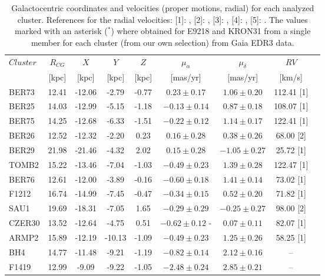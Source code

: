 \documentclass[referee]{aa}
\begin{document}
\begin{appendix}
  \begin{table}
   \caption{Galactocentric coordinates and velocities (proper motions, radial)
   for each analyzed cluster. References for the radial velocities: [1]: 
   \cite{Tarricq_2021}, [2]: \cite{Dias_2002}, [3]: \cite{Soubiran_2018}, [4]: 
   \cite{Dias_2007}, [5]: \cite{Frinchaboy_2006}. The values marked with an
   asterisk ($^*$) where obtained for E9218 and KRON31 from a single member for
   each cluster (from our own selection) from Gaia EDR3 data.}
   \label{tab:velocities}
   \centering
   \renewcommand{\arraystretch}{1.3}
   \begin{tabular}{lcccccccc}
    \hline \hline
    $Cluster$ & $R_{CG}$ & $X$ & $Y$ & $Z$ & $\mu_{\alpha}$ & $\mu_{\delta}$ & $RV$\\
     & [kpc] & [kpc] & [kpc] & [kpc] & [mas/yr] & [mas/yr] & [km/s]\\
    \hline
    BER73 & 12.41 & -12.06  & -2.79 & -0.77 & $0.23 \pm 0.17$ & $1.06 \pm 0.20$ & 112.41  [1]\\
    BER25 & 14.03 & -12.99  & -5.15 & -1.18 & $-0.13  \pm 0.14$ & $0.87 \pm 0.18$ & 108.07  [1]\\
    BER75 & 14.25 & -12.68  & -6.33 & -1.51 & $-0.22  \pm 0.12$ & $1.14 \pm 0.17$ & 122.41  [1]\\
    BER26 & 12.52 & -12.32  & -2.20 & 0.23  & $0.16 \pm 0.28$ & $0.38 \pm 0.26$ & 68.00 [2]\\
    BER29 & 21.98 & -21.46  & -4.32 & 2.02  & $0.15 \pm 0.28$ & $-1.05  \pm 0.27$ & 25.72 [1]\\
    TOMB2 & 15.22 & -13.46  & -7.04 & -1.03 & $-0.49  \pm 0.23$ & $1.39 \pm 0.28$ & 122.47  [1]\\
    BER76 & 12.61 & -12.00  & -3.89 & -0.16 & $-0.60  \pm 0.18$ & $1.41 \pm 0.14$ & 73.02 [1]\\
    F1212 & 16.74 & -14.99  & -7.45 & -0.47 & $-0.34  \pm 0.15$ & $0.52 \pm 0.20$ & 71.82 [1]\\
    SAU1  & 19.69 & -18.31  & -7.05 & 1.65  & $-0.29  \pm 0.29$ & $-0.25  \pm 0.27$ & 98.00 [2]\\
    CZER30  & 13.52 & -12.64  & -4.75 & 0.51  & $-0.62  \pm 0.12$ -&  $0.07 \pm 0.11$ & 82.07 [1]\\
    ARMP2 & 15.89 & -12.19  & -10.13  & -1.09 & $-0.49  \pm 0.23$ & $1.25 \pm 0.26$ & 58.25 [1]\\
    BH4 & 14.77 & -11.48  & -9.21 & -1.19 & $-0.82  \pm 0.14$ & $2.12\pm0.16$ & --  \\
    F1419 & 12.99 & -9.09 & -9.22 & -1.05 & $-2.48  \pm 0.24$ & $2.85 \pm 0.21$ & --\\  

\end{tabular}
\end{table}
\end{appendix}
\end{document}
